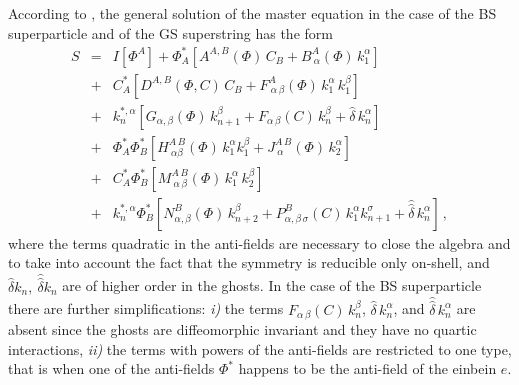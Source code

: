 \documentclass[a4paper,12pt]{article}
\begin{document}
According to \cite{Lindstrom_BS,kallosh,GH,Tonin,Lindstrom}, the 
general solution of the master equation in the case of the BS
superparticle and of the GS superstring has the form
\begin{eqnarray}\label{eq:stru}
S &=& I[\Phi^A] + \Phi^{*}_A \left[ A^{A,B} ( \Phi) \, C_B +
  B^A_{~\alpha} ( \Phi)\,  k^{\alpha}_{1}  \right]  
\nonumber \\&+& C^{*}_A \left[ D^{A,B}(\Phi,C) \, C_B + 
F^A_{~\alpha\,\beta}(\Phi)\,  k^{\alpha}_{1}\,  k^{\beta}_{1} \right]
\nonumber \\&+&  k^{*,\alpha}_{n} \left[ G_{\alpha,\beta}(\Phi) \,
  k^\beta_{n+1} +  
F_{\alpha\,\beta}(C) \,  k^{\beta}_{n} + \hat{\delta}\, k^{\alpha}_{n}
\right]  
 \\&+& \Phi^{*}_A \Phi^{*}_B \left[ H^{A\, B}_{~\alpha \beta } ( \Phi)
   \,k^\alpha_{1}  k^\beta_{1}    
+ J^{A\, B}_{~\alpha} ( \Phi)\,  k^{\alpha}_{2}  \right] 
\nonumber \\&+&  C^{*}_A  \Phi^{*}_B   \left[ M^{A\,
    B}_{~\alpha\,\beta}(\Phi)\,  k^{\alpha}_{1}\,  k^{\beta}_{2}
\right] 
\nonumber \\&+&  k^{*,\alpha}_{n}  \Phi^{*}_B  \left[
  N^B_{\alpha,\beta}(\Phi) \, k^\beta_{n+2} +  
P^B_{\alpha, \beta\, \sigma}(C) \, k^{\alpha}_{1}  k^{\sigma}_{n+1} +
\hat{\hat{\delta}}\, k^{\alpha}_{n} \right] \,,\nonumber 
\end{eqnarray}
where the terms quadratic in the anti-fields are necessary to close
the algebra and to take into account the fact that  
the symmetry is reducible only on-shell, and $\hat\delta k_n,
~\hat{\hat\delta} k_n$ are of higher order in the ghosts.  
In the case of the BS
superparticle there are  further simplifications:  
{\it i)} the terms $F_{\alpha\,\beta}(C) \,  k^{\beta}_{n}$,
$\hat{\delta}\, k^{\alpha}_{n}$, and  
$ \hat{\hat{\delta}}\, k^{\alpha}_{n} $ are absent since the ghosts
are diffeomorphic invariant and they have no quartic  
interactions,  {\it ii)} the terms with powers of the anti-fields are
restricted to one type, that is when one of the anti-fields $\Phi^*$  
happens to be the anti-field of the einbein $e$. 
\end{document}
